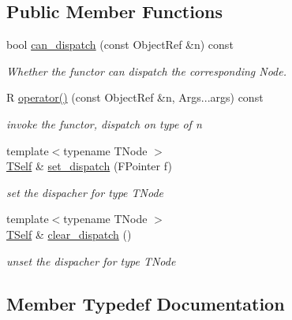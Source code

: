 \subsection*{Public Member Functions}
\begin{DoxyCompactItemize}
\item 
bool \hyperlink{classtvm_1_1NodeFunctor_3_01R_07const_01ObjectRef_01_6n_00_01Args_8_8_8_08_4_a3233a0b1e9898fc719e72db783881c71}{can\+\_\+dispatch} (const Object\+Ref \&n) const 
\begin{DoxyCompactList}\small\item\em Whether the functor can dispatch the corresponding Node. \end{DoxyCompactList}\item 
R \hyperlink{classtvm_1_1NodeFunctor_3_01R_07const_01ObjectRef_01_6n_00_01Args_8_8_8_08_4_a0b4aaedd0c2bb1f4c20b78221d30ef54}{operator()} (const Object\+Ref \&n, Args...\+args) const 
\begin{DoxyCompactList}\small\item\em invoke the functor, dispatch on type of n \end{DoxyCompactList}\item 
{\footnotesize template$<$typename T\+Node $>$ }\\\hyperlink{classtvm_1_1NodeFunctor_3_01R_07const_01ObjectRef_01_6n_00_01Args_8_8_8_08_4}{T\+Self} \& \hyperlink{classtvm_1_1NodeFunctor_3_01R_07const_01ObjectRef_01_6n_00_01Args_8_8_8_08_4_a2fcc19e5151e9b9e56cafc76231b29fd}{set\+\_\+dispatch} (F\+Pointer f)
\begin{DoxyCompactList}\small\item\em set the dispacher for type T\+Node \end{DoxyCompactList}\item 
{\footnotesize template$<$typename T\+Node $>$ }\\\hyperlink{classtvm_1_1NodeFunctor_3_01R_07const_01ObjectRef_01_6n_00_01Args_8_8_8_08_4}{T\+Self} \& \hyperlink{classtvm_1_1NodeFunctor_3_01R_07const_01ObjectRef_01_6n_00_01Args_8_8_8_08_4_a7c6f675b3c24ea09365a646b2ca7c77e}{clear\+\_\+dispatch} ()
\begin{DoxyCompactList}\small\item\em unset the dispacher for type T\+Node \end{DoxyCompactList}\end{DoxyCompactItemize}


\subsection{Member Typedef Documentation}
